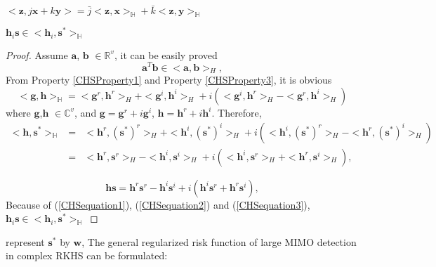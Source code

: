 \documentclass[12pt, draftclsnofoot, onecolumn]{IEEEtran}
\begin{document}
\begin{Property}
$<\mathbf{z}, j\mathbf{x}+k\mathbf{y}>=\bar{j}<\mathbf{z},\mathbf{x}>_{\mathbb{H}}+\bar{k}<\mathbf{z}, \mathbf{y}>_{\mathbb{H}}$
\label{CHSProperty3}
\end{Property}

\begin{Lemma}
$\mathbf{h}_{i}\mathbf{s}\in <\mathbf{h}_{i},\mathbf{s}^{*}>_{\mathbb{H}}$
\end{Lemma}    

\begin{proof}
Assume $\mathbf{a}$, $\mathbf{b}$ $\in \mathbb{R}^{v}$, it can be easily proved  
\begin{equation}
\mathbf{a}^{T}\mathbf{b} \in <\mathbf{a}, \mathbf{b}>_{H},
\label{CHSequation1}
\end{equation}
 From Property \ref{CHSProperty1} and Property \ref{CHSProperty3}, it is obvious 
\begin{equation}
<\mathbf{g},\mathbf{h}>_{\mathbb{H}}=<\mathbf{g}^{r},\mathbf{h}^{r}>_{H}+<\mathbf{g}^{i},\mathbf{h}^{i}>_{H}+i(<\mathbf{g}^{i},\mathbf{h}^{r}>_{H}-<\mathbf{g}^{r},\mathbf{h}^{i}>_{H})
\label{CHSProperty4}
\end{equation}
where $\mathbf{g}$,$\mathbf{h}$ $\in \mathbb{C}^{v}$, and $\mathbf{g}=\mathbf{g}^{r}+i\mathbf{g}^{i}$, $\mathbf{h}=\mathbf{h}^{r}+i\mathbf{h}^{i}$. Therefore, 
\begin{eqnarray}
\nonumber
<\mathbf{h}, \mathbf{s}^{*}>_{\mathbb{H}}&=&<\mathbf{h}^{r},  (\mathbf{s}^{*})^{r}>_{H}+<\mathbf{h}^{i},  (\mathbf{s}^{*})^{i}>_{H}+i(<\mathbf{h}^{i},  (\mathbf{s}^{*})^{r}>_{H}-<\mathbf{h}^{r},  (\mathbf{s}^{*})^{i}>_{H})\\
&=&<\mathbf{h}^{r}, \mathbf{s}^{r}>_{H}-<\mathbf{h}^{i}, \mathbf{s}^{i}>_{H}+i(<\mathbf{h}^{i}, \mathbf{s}^{r}>_{H}+<\mathbf{h}^{r}, \mathbf{s}^{i}>_{H}),
\label{CHSequation2}
\end{eqnarray}

\begin{equation}
\mathbf{h}\mathbf{s}=\mathbf{h}^{r}\mathbf{s}^{r}-\mathbf{h}^{i}\mathbf{s}^{i}+i(\mathbf{h}^{i}\mathbf{s}^{r}+\mathbf{h}^{r}\mathbf{s}^{i}),
\label{CHSequation3}
\end{equation}
Because of (\ref{CHSequation1}), (\ref{CHSequation2}) and (\ref{CHSequation3}), $\mathbf{h}_{i}\mathbf{s}\in <\mathbf{h}_{i},\mathbf{s}^{*}>_{\mathbb{H}}$
\end{proof}
represent $\mathbf{s}^{*}$ by $\mathbf{w}$, The general regularized risk function of large MIMO detection in complex RKHS can be formulated:
\end{document}
